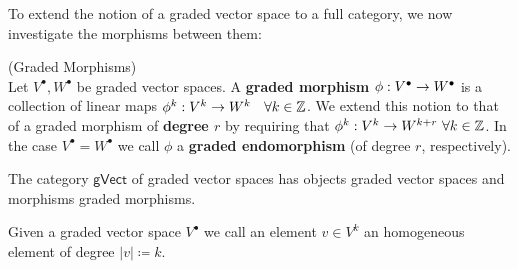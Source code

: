 To extend the notion of a graded vector space to a full category, we now investigate the morphisms between them:

\begin{definition} (Graded Morphisms)\\
 Let $V^\bullet, W^\bullet$ be graded vector spaces.  A \textbf{graded morphism} $\phi: V^\bullet \ra W^\bullet$ is  a collection of linear maps $\phi^k: V^k \ra W^k$ \ $\forall k \in \mathbb{Z}$. We extend this notion to that of a graded morphism of \textbf{degree $r$} by requiring that $\phi^k: V^k \ra W^{k+r}\ \forall k \in \ZZ$. In the case $V^\bullet = W^\bullet$ we call $\phi$ a \textbf{graded endomorphism} (of degree $r$, respectively).
 
 The category $\mathsf{gVect}$ of graded vector spaces has objects graded vector spaces and morphisms graded morphisms. 
\end{definition}

Given a graded vector space $V^\bullet$ we call an element $v\in V^k$ an homogeneous element of degree $|v|\coloneqq k$.

